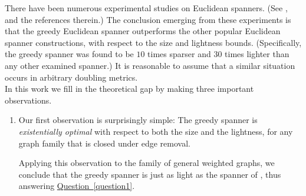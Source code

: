 \documentclass[11pt,letterpaper]{article}
\newcommand{\namedref}[2]{\hyperref[#2]{#1~\ref*{#2}}}
\newcommand{\questionref}[1]{\namedref{Question}{#1}}
\begin{document}
There have been numerous experimental studies on Euclidean spanners. (See \cite{FG05,Far08}, and the references therein.)
The conclusion emerging from these experiments is that the greedy Euclidean spanner outperforms the other popular Euclidean spanner constructions, with respect to the
size and lightness bounds. (Specifically, the greedy spanner was found to be $10$ times sparser and $30$ times lighter than any other examined spanner.)
It is reasonable to assume that a similar situation occurs in arbitrary doubling metrics.
\vspace{6pt}
\\
In this work we fill in the theoretical gap by making three important observations.
\begin{enumerate}
	\item Our first observation is surprisingly simple: The greedy spanner is \emph{existentially optimal} with respect to both the size and the lightness,
	for any graph family  that is closed under edge removal.
	
	\vspace{5pt}	
	Applying this observation to the family of general weighted graphs, we conclude that the greedy spanner is just as light as the spanner of \cite{CW18}, thus answering \questionref{question1}.


\end{enumerate}
\end{document}
